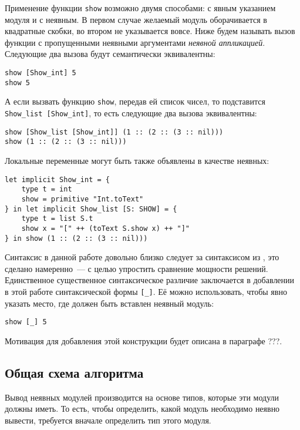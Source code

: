 \documentclass[../diploma.tex]{subfiles}
\begin{document}
Применение функции \texttt{show} возможно двумя способами: с явным указанием модуля и с неявным. В первом случае желаемый модуль оборачивается в квадратные скобки, во втором не указывается вовсе. Ниже будем называть вызов функции с пропущенными неявными аргументами \textit{неявной аппликацией}. Следующие два вызова будут семантически эквивалентны:

\begin{verbatim}
show [Show_int] 5
show 5
\end{verbatim}

А если вызвать функцию \texttt{show}, передав ей список чисел, то подставится \\ \texttt{Show\_list [Show\_int]}, то есть следующие два вызова эквивалентны:

\begin{verbatim}
show [Show_list [Show_int]] (1 :: (2 :: (3 :: nil)))
show (1 :: (2 :: (3 :: nil)))
\end{verbatim}

Локальные переменные могут быть также объявлены в качестве неявных:

\begin{verbatim}
let implicit Show_int = {
    type t = int
    show = primitive "Int.toText"
} in let implicit Show_list [S: SHOW] = {
    type t = list S.t
    show x = "[" ++ (toText S.show x) ++ "]"
} in show (1 :: (2 :: (3 :: nil)))
\end{verbatim}

Синтаксис в данной работе довольно близко следует за синтаксисом из \cite{white}, это сделано намеренно~--- с целью упростить сравнение мощности решений. Единственное существенное синтаксическое различие заключается в добавлении в этой работе синтаксической формы \texttt{[\_]}. Её можно использовать, чтобы явно указать место, где должен быть вставлен неявный модуль:

\begin{verbatim}
show [_] 5
\end{verbatim}

Мотивация для добавления этой конструкции будет описана в параграфе ???.

\subsection{Общая схема алгоритма}

Вывод неявных модулей производится на основе типов, которые эти модули должны иметь. То есть, чтобы определить, какой модуль необходимо неявно вывести, требуется вначале определить тип этого модуля. 
\end{document}
